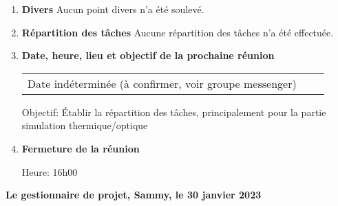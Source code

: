 \documentclass[12pt]{ULojpv}
\begin{document}
\begin{enumerate}
\begin{enumerate}
      
   \end{enumerate}

\item \textbf{Divers}
   Aucun point divers n'a été soulevé.

\item \textbf{Répartition des tâches}
   Aucune répartition des tâches n'a été effectuée.



\item \textbf{Date, heure, lieu et objectif de la prochaine réunion}

\begin{tabular}{@{}lll}
   Date indéterminée (à confirmer, voir groupe messenger)
\end{tabular}
\par

Objectif: Établir la répartition des tâches, principalement pour la partie simulation thermique/optique


\item \textbf{Fermeture de la réunion}

Heure: 16h00




\end{enumerate}

\begin{flushright}
   \textbf{Le gestionnaire de projet, Sammy, le 30 janvier 2023}

\end{flushright}
\end{document}
